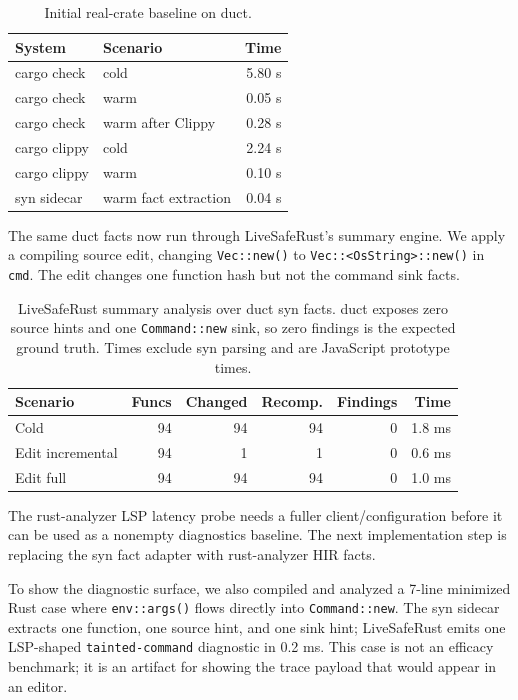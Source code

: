 \documentclass[sigconf,nonacm]{acmart}
\begin{document}
\begin{table}[h]
\caption{Initial real-crate baseline on duct.}
\label{tab:duct-baseline}
\begin{tabular}{llr}
\toprule
System & Scenario & Time \\
\midrule
cargo check & cold & 5.80 s \\
cargo check & warm & 0.05 s \\
cargo check & warm after Clippy & 0.28 s \\
cargo clippy & cold & 2.24 s \\
cargo clippy & warm & 0.10 s \\
syn sidecar & warm fact extraction & 0.04 s \\
\bottomrule
\end{tabular}
\end{table}

The same duct facts now run through LiveSafeRust's summary engine. We apply a
compiling source edit, changing \texttt{Vec::new()} to
\texttt{Vec::<OsString>::new()} in \texttt{cmd}. The edit changes one function
hash but not the command sink facts.

\begin{table}[h]
\caption{LiveSafeRust summary analysis over duct syn facts. duct exposes zero
source hints and one \texttt{Command::new} sink, so zero findings is the
expected ground truth. Times exclude syn parsing and are JavaScript prototype
times.}
\label{tab:duct-livesaferust}
\begin{tabular}{lrrrrr}
\toprule
Scenario & Funcs & Changed & Recomp. & Findings & Time \\
\midrule
Cold & 94 & 94 & 94 & 0 & 1.8 ms \\
Edit incremental & 94 & 1 & 1 & 0 & 0.6 ms \\
Edit full & 94 & 94 & 94 & 0 & 1.0 ms \\
\bottomrule
\end{tabular}
\end{table}

The rust-analyzer LSP latency probe needs a fuller client/configuration before
it can be used as a nonempty diagnostics baseline. The next implementation step
is replacing the syn fact adapter with rust-analyzer HIR facts.

To show the diagnostic surface, we also compiled and analyzed a 7-line minimized
Rust case where \texttt{env::args()} flows directly into
\texttt{Command::new}. The syn sidecar extracts one function, one source hint,
and one sink hint; LiveSafeRust emits one LSP-shaped
\texttt{tainted-command} diagnostic in 0.2 ms. This case is not an efficacy
benchmark; it is an artifact for showing the trace payload that would appear in
an editor.
\end{document}
